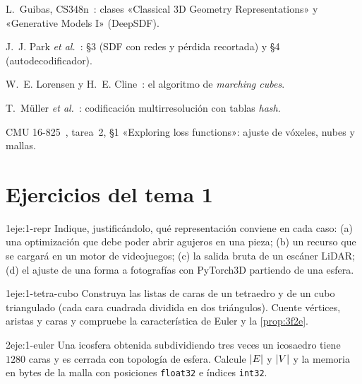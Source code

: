 \begin{lecturas}
\item L.~Guibas, CS348n~\cite{cs348n}: clases «Classical 3D Geometry Representations» y «Generative Models I» (DeepSDF).
\item J.~J. Park \emph{et al.}~\cite{deepsdf}: §3 (SDF con redes y pérdida recortada) y §4 (autodecodificador).
\item W.~E. Lorensen y H.~E. Cline~\cite{mc}: el algoritmo de \emph{marching cubes}.
\item T.~Müller \emph{et al.}~\cite{ingp}: codificación multirresolución con tablas \emph{hash}.
\item CMU 16-825~\cite{cmu16825}, tarea~2, §1 «Exploring loss functions»: ajuste de vóxeles, nubes y mallas.
\end{lecturas}

\section*{Ejercicios del tema 1}

\begin{ejercicio}{1}{eje:1-repr}
Indique, justificándolo, qué representación conviene en cada caso: (a) una optimización que debe poder abrir agujeros en una pieza; (b) un recurso que se cargará en un motor de videojuegos; (c) la salida bruta de un escáner LiDAR; (d) el ajuste de una forma a fotografías con PyTorch3D partiendo de una esfera.
\end{ejercicio}

\begin{ejercicio}{1}{eje:1-tetra-cubo}
Construya las listas de caras de un tetraedro y de un cubo triangulado (cada cara cuadrada dividida en dos triángulos). Cuente vértices, aristas y caras y compruebe la característica de Euler y la \cref{prop:3f2e}.
\end{ejercicio}

\begin{ejercicio}{2}{eje:1-euler}
Una icosfera obtenida subdividiendo tres veces un icosaedro tiene $1280$ caras y es cerrada con topología de esfera. Calcule $\lvert E\rvert$ y $\lvert V\rvert$ y la memoria en bytes de la malla con posiciones \texttt{float32} e índices \texttt{int32}.
\end{ejercicio}

